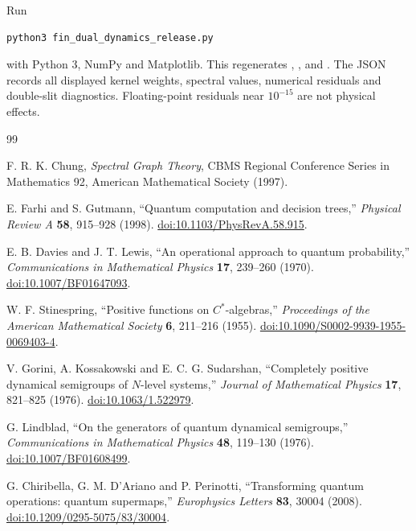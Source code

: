 \documentclass[11pt,a4paper]{article}
\theoremstyle{definition}
\theoremstyle{remark}
\begin{document}
Run
\begin{verbatim}
python3 fin_dual_dynamics_release.py
\end{verbatim}
with Python 3, NumPy and Matplotlib. This regenerates
,
, and
.
The JSON records all displayed kernel weights, spectral values, numerical residuals and double-slit diagnostics. Floating-point residuals near $10^{-15}$ are not physical effects.

\begin{thebibliography}{99}

F. R. K. Chung, \emph{Spectral Graph Theory}, CBMS Regional Conference Series in Mathematics 92, American Mathematical Society (1997).

E. Farhi and S. Gutmann, ``Quantum computation and decision trees,'' \emph{Physical Review A} \textbf{58}, 915--928 (1998). \href{https://doi.org/10.1103/PhysRevA.58.915}{doi:10.1103/PhysRevA.58.915}.

E. B. Davies and J. T. Lewis, ``An operational approach to quantum probability,'' \emph{Communications in Mathematical Physics} \textbf{17}, 239--260 (1970). \href{https://doi.org/10.1007/BF01647093}{doi:10.1007/BF01647093}.

W. F. Stinespring, ``Positive functions on $C^*$-algebras,'' \emph{Proceedings of the American Mathematical Society} \textbf{6}, 211--216 (1955). \href{https://doi.org/10.1090/S0002-9939-1955-0069403-4}{doi:10.1090/S0002-9939-1955-0069403-4}.

V. Gorini, A. Kossakowski and E. C. G. Sudarshan, ``Completely positive dynamical semigroups of $N$-level systems,'' \emph{Journal of Mathematical Physics} \textbf{17}, 821--825 (1976). \href{https://doi.org/10.1063/1.522979}{doi:10.1063/1.522979}.

G. Lindblad, ``On the generators of quantum dynamical semigroups,'' \emph{Communications in Mathematical Physics} \textbf{48}, 119--130 (1976). \href{https://doi.org/10.1007/BF01608499}{doi:10.1007/BF01608499}.

G. Chiribella, G. M. D'Ariano and P. Perinotti, ``Transforming quantum operations: quantum supermaps,'' \emph{Europhysics Letters} \textbf{83}, 30004 (2008). \href{https://doi.org/10.1209/0295-5075/83/30004}{doi:10.1209/0295-5075/83/30004}.


\end{thebibliography}
\end{document}

